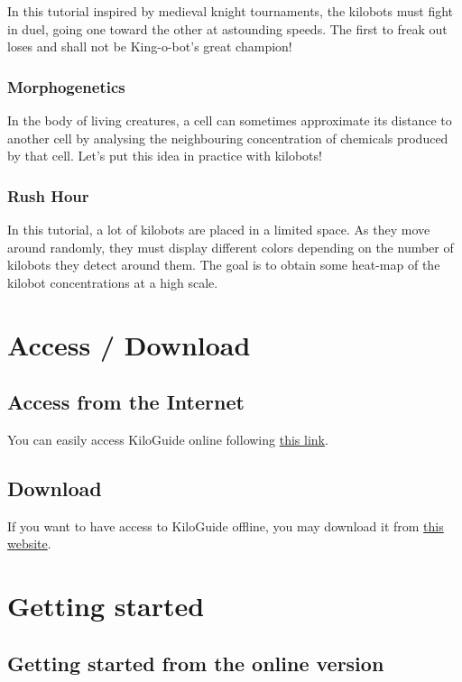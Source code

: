 \documentclass[a4paper,12pt,titlepage]{scrartcl}
\begin{document}
In this tutorial inspired by medieval knight tournaments, the kilobots must fight in duel, going one toward the other at astounding speeds. The first to freak out loses and shall not be King-o-bot's great champion!

\subsubsection{Morphogenetics}

In the body of living creatures, a cell can sometimes approximate its distance to another cell by analysing the neighbouring concentration of chemicals produced by that cell. Let's put this idea in practice with kilobots!

\subsubsection{Rush Hour}

In this tutorial, a lot of kilobots are placed in a limited space. As they move around randomly, they must display different colors depending on the number of kilobots they detect around them. The goal is to obtain some heat-map of the kilobot concentrations at a high scale.

\section{Access / Download}

\subsection{Access from the Internet}

You can easily access KiloGuide online following \href{https://simlej18.github.io/KiloGuide/}{this link}.

\subsection{Download}

If you want to have access to KiloGuide offline, you may download it from \href{https://www.mediafire.com/file/olqogopejhlbe3z/KiloGuide.zip/file}{this website}.

\section{Getting started}

\subsection{Getting started from the online version}
\end{document}
